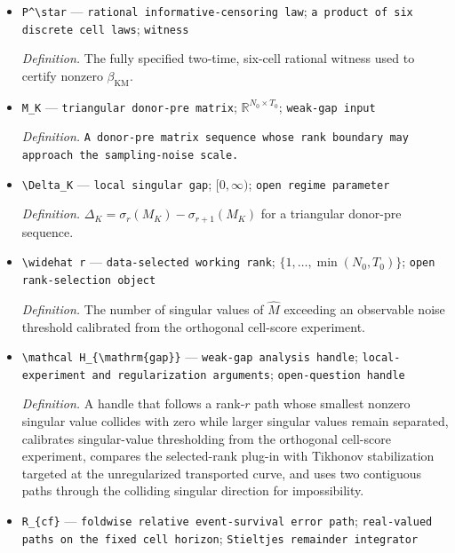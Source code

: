 \documentclass{article}
\begin{document}
\begin{itemize}
  \item \texttt{P\textasciicircum{}\textbackslash{}\allowbreak{}star} --- \texttt{rational informative-\allowbreak{}censoring law}; \texttt{a product of six discrete cell laws}; \texttt{witness}
  \par\smallskip\noindent\emph{Definition.} The fully specified two-time, six-cell rational witness used to certify nonzero \(\beta_{\mathrm{KM}}\).
  \item \texttt{M\_\allowbreak{}K} --- \texttt{triangular donor-\allowbreak{}pre matrix}; \(\mathbb R^{N_0\times T_0}\); \texttt{weak-\allowbreak{}gap input}
  \par\smallskip\noindent\emph{Definition.} \texttt{A donor-\allowbreak{}pre matrix sequence whose rank boundary may approach the sampling-\allowbreak{}noise scale.}
  \item \texttt{\textbackslash{}\allowbreak{}Delta\_\allowbreak{}K} --- \texttt{local singular gap}; \([0,\infty)\); \texttt{open regime parameter}
  \par\smallskip\noindent\emph{Definition.} \(\Delta_K=\sigma_r(M_K)-\sigma_{r+1}(M_K)\) for a triangular donor-pre sequence.
  \item \texttt{\textbackslash{}\allowbreak{}widehat r} --- \texttt{data-\allowbreak{}selected working rank}; \(\{1,\ldots,\min(N_0,T_0)\}\); \texttt{open rank-\allowbreak{}selection object}
  \par\smallskip\noindent\emph{Definition.} The number of singular values of \(\widehat M\) exceeding an observable noise threshold calibrated from the orthogonal cell-score experiment.
  \item \texttt{\textbackslash{}\allowbreak{}mathcal H\_\allowbreak{}\{\textbackslash{}\allowbreak{}mathrm\{gap\}\allowbreak{}\}\allowbreak{}} --- \texttt{weak-\allowbreak{}gap analysis handle}; \texttt{local-\allowbreak{}experiment and regularization arguments}; \texttt{open-\allowbreak{}question handle}
  \par\smallskip\noindent\emph{Definition.} A handle that follows a rank-\(r\) path whose smallest nonzero singular value collides with zero while larger singular values remain separated, calibrates singular-value thresholding from the orthogonal cell-score experiment, compares the selected-rank plug-in with Tikhonov stabilization targeted at the unregularized transported curve, and uses two contiguous paths through the colliding singular direction for impossibility.
  \item \texttt{R\_\allowbreak{}\{cf\}\allowbreak{}} --- \texttt{foldwise relative event-\allowbreak{}survival error path}; \texttt{real-\allowbreak{}valued paths on the fixed cell horizon}; \texttt{Stieltjes remainder integrator}

\end{itemize}
\end{document}
